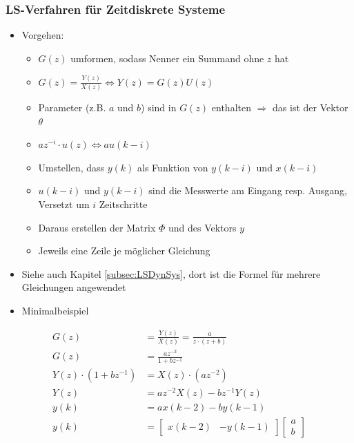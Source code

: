 \subsubsection{LS-Verfahren für Zeitdiskrete Systeme}
\begin{itemize}
	\item Vorgehen:
	\begin{itemize}
		\item $G(z)$ umformen, sodass Nenner ein Summand ohne $z$ hat
		\item []$G(z) = \frac{Y(z)}{X(z)} \Leftrightarrow Y(z) = G(z)U(z)$
		\item Parameter (z.B. $a$ und $b$) sind in $G(z)$ enthalten $\Rightarrow$ das ist der Vektor $\theta$
		\item []$  az^{-i}\cdot u(z) \Leftrightarrow au(k-i)$
		\item Umstellen, dass $y(k)$ als Funktion von $y(k-i)$ und $x(k-i)$
		\item $u(k-i)$ und $y(k-i)$ sind die Messwerte am Eingang resp. Ausgang, Versetzt um $i$ Zeitschritte
		\item Daraus erstellen der Matrix $\Phi$ und des Vektors $y$ 
		\item Jeweils eine Zeile je möglicher Gleichung
	\end{itemize}
	\item Siehe auch Kapitel \ref{subsec:LSDynSys}, dort ist die Formel für mehrere Gleichungen angewendet
	\item Minimalbeispiel
\end{itemize}
\begin{align*}
	G(z) &= \frac{Y(z)}{X(z)} = \frac{a}{z\cdot(z+b)}\\
	G(z) &= \frac{az^{-2}}{1+bz^{-1}}\\
	Y(z)\cdot \left(1+bz^{-1}\right) &= X(z)\cdot \left(az^{-2}\right)\\
	Y(z) &= az^{-2}X(z)-bz^{-1}Y(z)\\
	y(k) &= ax(k-2)-by(k-1)\\
	y(k) &= \begin{bmatrix}
		x(k-2) & -y(k-1)
	\end{bmatrix}\begin{bmatrix}
	a \\b
	\end{bmatrix}
\end{align*}


